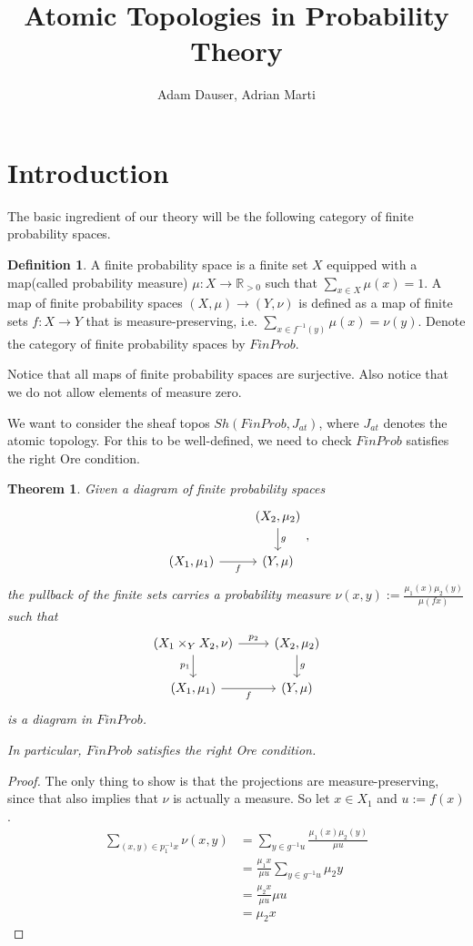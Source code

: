 \documentclass[a4paper,draft]{amsproc}
\title{\textbf{Atomic Topologies in Probability Theory}}
\author{Adam Dauser, Adrian Marti}
\date{}
\theoremstyle{plain}
\newtheorem{theorem}{Theorem}[section]
\theoremstyle{definition}
\newtheorem{definition}{Definition}[section]
\theoremstyle{remark}
\numberwithin{equation}{section}
\begin{document}
\maketitle 
\section{Introduction}

The basic ingredient of our theory will be the following category of finite probability spaces.

\begin{definition}
A finite probability space is a finite set $X$ equipped with a map(called probability measure) $\mu: X \to \mathbb{R}_{>0}$ such that $\sum_{x \in X} \mu(x) = 1$. A map of finite probability spaces $(X,\mu) \to (Y,\nu)$ is defined as a map of finite sets $f: X \to Y$ that is measure-preserving, i.e. $\sum_{x \in f^{-1}(y)} \mu(x) = \nu(y)$. Denote the category of finite probability spaces by $FinProb$.
\end{definition}

Notice that all maps of finite probability spaces are surjective. Also notice that we do not allow elements of measure zero.

We want to consider the sheaf topos $Sh(FinProb, J_{at})$, where $J_{at}$ denotes the atomic topology. For this to be well-defined, we need to check $FinProb$ satisfies the right Ore condition.

\begin{theorem} \label{pullback_measure}
Given a diagram of finite probability spaces
\[
\begin{tikzcd}
                               & {(X_2,\mu_2)} \arrow[d, "g"] \\
{(X_1, \mu_1)} \arrow[r, "f"'] & {(Y,\mu)}                   
\end{tikzcd},
\]
the pullback of the finite sets carries a probability measure $\nu(x,y) := \frac{\mu_1(x) \mu_2(y)}{\mu(f x)}$ such that
\[
\begin{tikzcd}
{(X_1 \times_Y X_2, \nu)} \arrow[d, "p_1"'] \arrow[r, "p_2"] & {(X_2,\mu_2)} \arrow[d, "g"] \\
{(X_1, \mu_1)} \arrow[r, "f"']                               & {(Y,\mu)}                   
\end{tikzcd}
\]
is a diagram in $FinProb$.

In particular, $FinProb$ satisfies the right Ore condition.
\end{theorem}
\begin{proof}
The only thing to show is that the projections are measure-preserving, since that also implies that $\nu$ is actually a measure. So let $x \in X_1$ and $u := f(x)$.
\begin{align*}
\sum_{(x,y) \in p_1^{-1} x} \nu(x,y) &= \sum_{y \in g^{-1} u} \frac{\mu_1(x)\mu_2(y)}{\mu u} \\
&= \frac{\mu_1 x}{\mu u} \sum_{y \in g^{-1} u} \mu_2 y \\
&= \frac{\mu_2 x}{\mu u} \mu u \\
&= \mu_2 x
\end{align*}
\end{proof}
\end{document}
